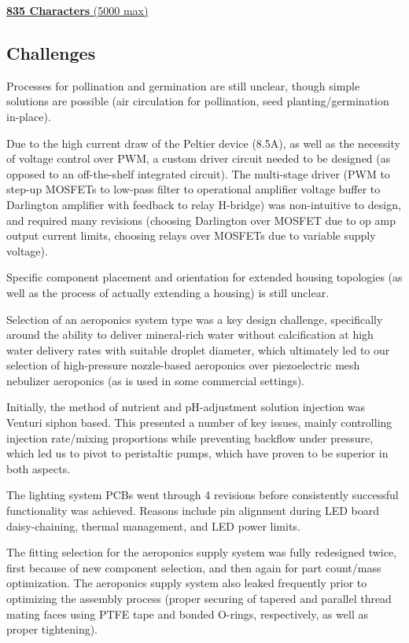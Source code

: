 \documentclass{../tex/report}
\begin{document}
\uline{\textbf{835 Characters} (5000 max)}

\subsection{Challenges}

Processes for pollination and germination are still unclear, though simple solutions are possible (air circulation for pollination, seed planting/germination in-place).

Due to the high current draw of the Peltier device (8.5A), as well as the necessity of voltage control over PWM, a custom driver circuit needed to be designed (as opposed to an off-the-shelf integrated circuit). The multi-stage driver (PWM to step-up MOSFETs to low-pass filter to operational amplifier voltage buffer to Darlington amplifier with feedback to relay H-bridge) was non-intuitive to design, and required many revisions (choosing Darlington over MOSFET due to op amp output current limits, choosing relays over MOSFETs due to variable supply voltage).

Specific component placement and orientation for extended housing topologies (as well as the process of actually extending a housing) is still unclear.

Selection of an aeroponics system type was a key design challenge, specifically around the ability to deliver mineral-rich water without calcification at high water delivery rates with suitable droplet diameter, which ultimately led to our selection of high-pressure nozzle-based aeroponics over piezoelectric mesh nebulizer aeroponics (as is used in some commercial settings).

Initially, the method of nutrient and pH-adjustment solution injection was Venturi siphon based. This presented a number of key issues, mainly controlling injection rate/mixing proportions while preventing backflow under pressure, which led us to pivot to peristaltic pumps, which have proven to be superior in both aspects.

\clearpage

The lighting system PCBs went through 4 revisions before consistently successful functionality was achieved. Reasons include pin alignment during LED board daisy-chaining, thermal management, and LED power limits.

The fitting selection for the aeroponics supply system was fully redesigned twice, first because of new component selection, and then again for part count/mass optimization. The aeroponics supply system also leaked frequently prior to optimizing the assembly process (proper securing of tapered and parallel thread mating faces using PTFE tape and bonded O-rings, respectively, as well as proper tightening).
\end{document}

